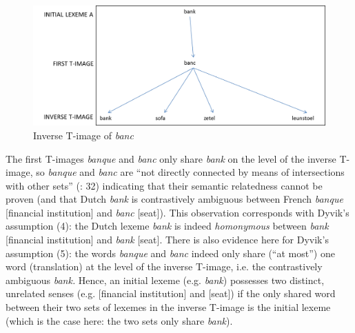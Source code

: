 \begin{figure}
\includegraphics[height=.3\textheight]{figures/Vandevoorde2-img10.png}
\caption{\label{fig:key:11}Inverse T-image of \textit{banc}}
\end{figure}


The first T-images \textit{banque} and \textit{banc} only share \textit{bank} on the level of the inverse T-image, so \textit{banque} and \textit{banc} are “not directly connected by means of intersections with other sets” (\citealt{langemets_translations_2005}: 32) indicating that their semantic relatedness cannot be proven (and that Dutch \textit{bank} is contrastively ambiguous between French \textit{banque} [financial institution] and \textit{banc} [seat]). This observation corresponds with Dyvik’s assumption (4): the Dutch lexeme \textit{bank} is indeed \textit{homonymous} between \textit{bank} [financial institution] and \textit{bank} [seat]. There is also evidence here for Dyvik’s assumption (5): the words \textit{banque} and \textit{banc} indeed only share (“at most”) one word (translation) at the level of the inverse T-image, i.e. the contrastively ambiguous \textit{bank.} Hence, an initial lexeme (e.g. \textit{bank}) possesses two distinct, unrelated senses (e.g. [financial institution] and [seat]) if the only shared word between their two sets of lexemes in the inverse T-image is the initial lexeme (which is the case here: the two sets only share \textit{bank}).


